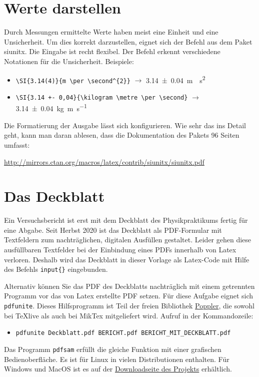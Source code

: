\documentclass[ngerman]{scrartcl}
\begin{document}
\section{Werte darstellen}
Durch Messungen ermittelte Werte haben meist eine Einheit und eine Unsicherheit. Um dies korrekt darzustellen, eignet sich der Befehl  aus dem Paket siunitx. Die Eingabe ist recht flexibel. Der Befehl erkennt verschiedene Notationen für die Unsicherheit. Beispiele:
\begin{itemize}
	\item \verb|\SI{3.14(4)}{m \per \second^{2}}| \hfill $\rightarrow$ \hfill
		\SI{3.14(4)}{m \per \second^{2}}
	\item \verb|\SI{3.14 +- 0,04}{\kilogram \metre \per \second}| \hfill $\rightarrow$ \hfill
		\SI{3.14 +- 0,04}{\kilogram \metre \per \second}
\end{itemize}
Die Formatierung der Ausgabe lässt sich konfigurieren. Wie sehr das ins Detail geht, kann man daran ablesen, dass die Dokumentation des Pakets 96 Seiten umfasst:
\begin{center} \url{http://mirrors.ctan.org/macros/latex/contrib/siunitx/siunitx.pdf} \end{center}

\section{Das Deckblatt}
Ein Versuchsbericht ist erst mit dem Deckblatt des Physikpraktikums fertig für eine Abgabe. Seit Herbst 2020 ist das Deckblatt als PDF-Formular mit Textfeldern zum nachträglichen, digitalen Ausfüllen gestaltet. Leider gehen diese ausfüllbaren Textfelder bei der Einbindung eines PDFs  innerhalb von Latex verloren. Deshalb wird das Deckblatt in dieser Vorlage als Latex-Code mit Hilfe des Befehls \verb|input{}| eingebunden.

Alternativ können Sie das PDF des Deckblatts nachträglich mit einem getrennten Programm vor das von Latex erstellte PDF setzen. Für diese Aufgabe eignet sich \verb|pdfunite|. Dieses Hilfsprogramm ist Teil der freien Bibliothek \href{http://poppler.freedesktop.org/}{Poppler}, die sowohl bei TeXlive als auch bei MikTex mitgeliefert wird. Aufruf in der Kommandozeile:
\begin{itemize}
	\item \verb|pdfunite Deckblatt.pdf BERICHT.pdf BERICHT_MIT_DECKBLATT.pdf|
\end{itemize}
Das Programm \verb|pdfsam| erfüllt die gleiche Funktion mit einer grafischen Bedienoberfläche. Es ist für Linux in vielen Distributionen enthalten. Für Windows und MacOS ist es auf der \href{https://pdfsam.org/download-pdfsam-basic/}{Downloadseite des Projekts} erhältlich.
\end{document}
